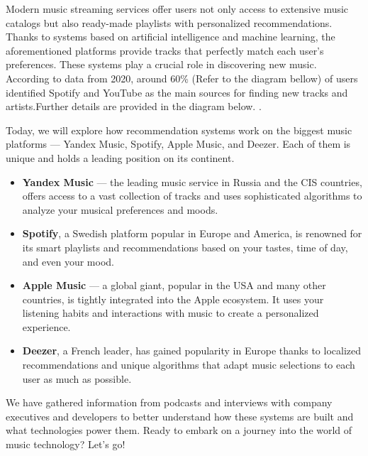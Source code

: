 \documentclass[12pt,a4paper]{article}
\begin{document}
Modern music streaming services offer users not only access to extensive music catalogs but also ready-made playlists with personalized recommendations. Thanks to systems based on artificial intelligence and machine learning, the aforementioned platforms provide tracks that perfectly match each user's preferences. These systems play a crucial role in discovering new music. According to data from 2020, around 60\% (Refer to the diagram bellow) of users identified Spotify and YouTube as the main sources for finding new tracks and artists.Further details are provided in the diagram below. \citep{href}.

Today, we will explore how recommendation systems work on the biggest music platforms — Yandex Music, Spotify, Apple Music, and Deezer. Each of them is unique and holds a leading position on its continent.

\begin{itemize}
 \item \textbf{Yandex Music} — the leading music service in Russia and the CIS countries, offers access to a vast collection of tracks and uses sophisticated algorithms to analyze your musical preferences and moods.

\item \textbf{Spotify}, a Swedish platform popular in Europe and America, is renowned for its smart playlists and recommendations based on your tastes, time of day, and even your mood.

\item \textbf{Apple Music} — a global giant, popular in the USA and many other countries, is tightly integrated into the Apple ecosystem. It uses your listening habits and interactions with music to create a personalized experience.

\item \textbf{Deezer}, a French leader, has gained popularity in Europe thanks to localized recommendations and unique algorithms that adapt music selections to each user as much as possible.
\end{itemize}


We have gathered information from podcasts and interviews with company executives and developers to better understand how these systems are built and what technologies power them. Ready to embark on a journey into the world of music technology? Let's go!
\end{document}
